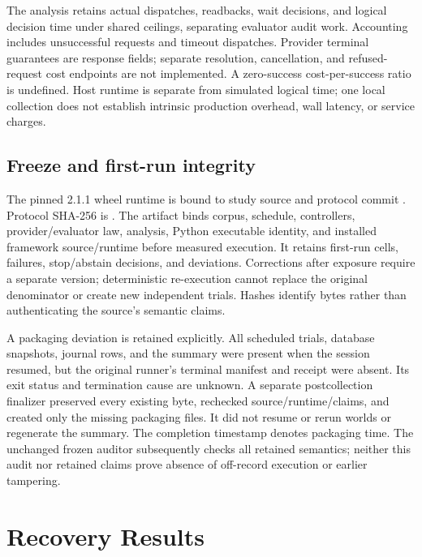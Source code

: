 \documentclass[conference]{IEEEtran}
\begin{document}
The analysis retains actual dispatches, readbacks, wait decisions, and logical decision time under shared ceilings, separating evaluator audit work. Accounting includes unsuccessful requests and timeout dispatches. Provider terminal guarantees are response fields; separate resolution, cancellation, and refused-request cost endpoints are not implemented. A zero-success cost-per-success ratio is undefined. Host runtime is separate from simulated logical time; one local collection does not establish intrinsic production overhead, wall latency, or service charges.

\subsection{Freeze and first-run integrity}

The pinned 2.1.1 wheel runtime is bound to study source \texttt{} and protocol commit \texttt{}. Protocol SHA-256 is \texttt{}. The artifact binds corpus, schedule, controllers, provider/evaluator law, analysis, Python executable identity, and installed framework source/runtime before measured execution. It retains first-run cells, failures, stop/abstain decisions, and deviations. Corrections after exposure require a separate version; deterministic re-execution cannot replace the original denominator or create new independent trials. Hashes identify bytes rather than authenticating the source's semantic claims.

A packaging deviation is retained explicitly. All scheduled trials, database snapshots, journal rows, and the summary were present when the session resumed, but the original runner's terminal manifest and receipt were absent. Its exit status and termination cause are unknown. A separate postcollection finalizer preserved every existing byte, rechecked source/runtime/claims, and created only the missing packaging files. It did not resume or rerun worlds or regenerate the summary. The completion timestamp denotes packaging time. The unchanged frozen auditor subsequently checks all retained semantics; neither this audit nor retained claims prove absence of off-record execution or earlier tampering.

\section{Recovery Results}
\label{sec:results}


\end{document}
